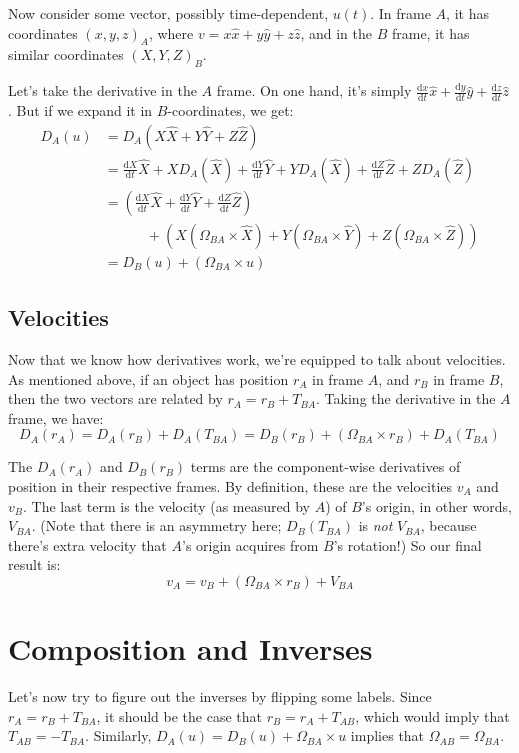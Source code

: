 \documentclass{article}
\newcommand{\dd}{\mathrm{d}}
\newcommand{\der}[2]{\frac{\dd #1}{\dd #2}}
\begin{document}
Now consider some vector, possibly time-dependent, $u(t)$. In frame $A$, it has coordinates $(x, y, z)_A$, where $v = x \hat x + y \hat y + z \hat z$, and in the $B$ frame, it has similar coordinates $(X, Y, Z)_B$.

Let's take the derivative in the $A$ frame. On one hand, it's simply $\der{x}{t} \hat x + \der{y}{t} \hat y + \der{z}{t} \hat z$. But if we expand it in $B$-coordinates, we get:
\begin{align*}
D_A (u) &= D_A (X \hat X + Y \hat Y + Z \hat Z) \\
&= \der{X}{t} \hat X + X D_A (\hat X) + \der{Y}{t} \hat Y + Y D_A (\hat X) + \der{Z}{t} \hat Z + Z D_A (\hat Z) \\
&= \left( \der{X}{t} \hat X + \der{Y}{t} \hat Y + \der{Z}{t} \hat Z \right) \\
&\qquad\quad + \left( X (\Omega_{BA} \times \hat X) + Y (\Omega_{BA} \times \hat Y) + Z (\Omega_{BA} \times \hat Z) \right) \\
&= D_B (u) + (\Omega_{BA} \times u)
\end{align*}

\subsection*{Velocities}

Now that we know how derivatives work, we're equipped to talk about velocities. As mentioned above, if an object has position $r_A$ in frame $A$, and $r_B$ in frame $B$, then the two vectors are related by $r_A = r_B + T_{BA}$. Taking the derivative in the $A$ frame, we have:
\[ D_A (r_A) = D_A (r_B) + D_A(T_{BA}) = D_B (r_B) + (\Omega_{BA} \times r_B) + D_A (T_{BA}) \]

The $D_A (r_A)$ and $D_B (r_B)$ terms are the component-wise derivatives of position in their respective frames. By definition, these are the velocities $v_A$ and $v_B$. The last term is the velocity (as measured by $A$) of $B$'s origin, in other words, $V_{BA}$. (Note that there is an asymmetry here; $D_B (T_{BA})$ is \textit{not} $V_{BA}$, because there's extra velocity that $A$'s origin acquires from $B$'s rotation!) So our final result is:
\[ v_A = v_B + (\Omega_{BA} \times r_B) + V_{BA} \]

\section*{Composition and Inverses}

Let's now try to figure out the inverses by flipping some labels. Since $r_A = r_B + T_{BA}$, it should be the case that $r_B = r_A + T_{AB}$, which would imply that $T_{AB} = -T_{BA}$. Similarly, $D_A(u) = D_B(u) + \Omega_{BA} \times u$ implies that $\Omega_{AB} = \Omega_{BA}$.
\end{document}
